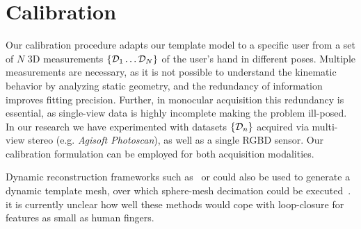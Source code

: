 
\section{Calibration}
\label{sec:modeling}

Our calibration procedure adapts our template model to a specific user from a set of $N$ 3D measurements $\{ \mathcal{D}_1 \dots \mathcal{D}_N \}$ of the user's hand in different poses. Multiple measurements are necessary, as it is not possible to understand the kinematic behavior by analyzing static geometry, and the redundancy of information improves fitting precision. Further, in  monocular acquisition this redundancy is essential, as single-view data is highly incomplete\todo{,} making the problem ill-posed. In our research we have experimented with datasets $\{\mathcal{D}_n\}$ acquired via multi-view stereo (e.g. \emph{Agisoft Photoscan}), as well as a single RGBD sensor. 
Our calibration formulation can be employed for both acquisition modalities.
\begin{draft}
Dynamic reconstruction frameworks such as~\cite{newcombe2015dynfusion} or \cite{innmann2016volume} could also be used to generate a dynamic template mesh, over which sphere-mesh decimation could be executed~\cite{thiery2016spheremesh}. 
 it is currently unclear how well these methods would cope with loop-closure for features as small as human fingers.
\end{draft}


